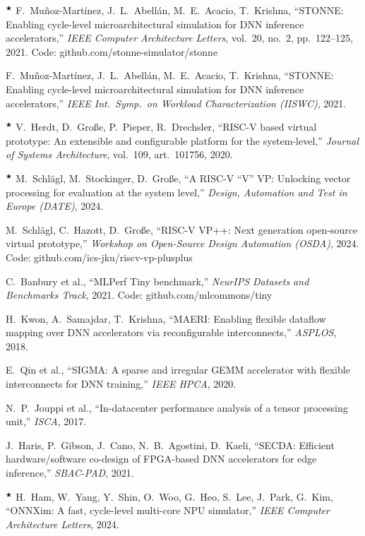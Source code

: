\documentclass[10pt,a4paper]{article}
\newcommand{\vstar}{$^\bigstar$}
\begin{document}
\begin{enumerate}[label={[\arabic*]}, leftmargin=2.6em, itemsep=5pt]
\item\vstar{} F.~Mu\~noz-Mart\'inez, J.~L.~Abell\'an, M.~E.~Acacio, T.~Krishna, ``STONNE: Enabling cycle-level microarchitectural simulation for DNN inference accelerators,'' \emph{IEEE Computer Architecture Letters}, vol.~20, no.~2, pp.~122--125, 2021. Code: github.com/stonne-simulator/stonne
\item F.~Mu\~noz-Mart\'inez, J.~L.~Abell\'an, M.~E.~Acacio, T.~Krishna, ``STONNE: Enabling cycle-level microarchitectural simulation for DNN inference accelerators,'' \emph{IEEE Int.\ Symp.\ on Workload Characterization (IISWC)}, 2021.
\item\vstar{} V.~Herdt, D.~Gro\ss e, P.~Pieper, R.~Drechsler, ``RISC-V based virtual prototype: An extensible and configurable platform for the system-level,'' \emph{Journal of Systems Architecture}, vol.~109, art.~101756, 2020.
\item\vstar{} M.~Schl\"agl, M.~Stockinger, D.~Gro\ss e, ``A RISC-V ``V'' VP: Unlocking vector processing for evaluation at the system level,'' \emph{Design, Automation and Test in Europe (DATE)}, 2024.
\item M.~Schl\"agl, C.~Hazott, D.~Gro\ss e, ``RISC-V VP++: Next generation open-source virtual prototype,'' \emph{Workshop on Open-Source Design Automation (OSDA)}, 2024. Code: github.com/ics-jku/riscv-vp-plusplus
\item C.~Banbury et al., ``MLPerf Tiny benchmark,'' \emph{NeurIPS Datasets and Benchmarks Track}, 2021. Code: github.com/mlcommons/tiny
\item H.~Kwon, A.~Samajdar, T.~Krishna, ``MAERI: Enabling flexible dataflow mapping over DNN accelerators via reconfigurable interconnects,'' \emph{ASPLOS}, 2018.
\item E.~Qin et al., ``SIGMA: A sparse and irregular GEMM accelerator with flexible interconnects for DNN training,'' \emph{IEEE HPCA}, 2020.
\item N.~P.~Jouppi et al., ``In-datacenter performance analysis of a tensor processing unit,'' \emph{ISCA}, 2017.
\item J.~Haris, P.~Gibson, J.~Cano, N.~B.~Agostini, D.~Kaeli, ``SECDA: Efficient hardware/software co-design of FPGA-based DNN accelerators for edge inference,'' \emph{SBAC-PAD}, 2021.
\item\vstar{} H.~Ham, W.~Yang, Y.~Shin, O.~Woo, G.~Heo, S.~Lee, J.~Park, G.~Kim, ``ONNXim: A fast, cycle-level multi-core NPU simulator,'' \emph{IEEE Computer Architecture Letters}, 2024.

\end{enumerate}
\end{document}
